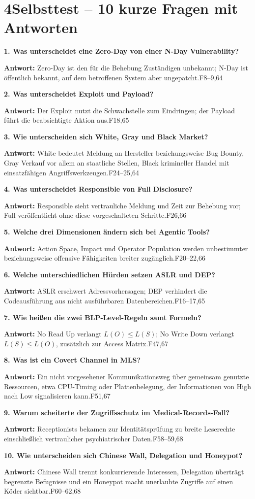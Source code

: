 \documentclass[11pt,a4paper]{article}
\newcommand{\qa}[3]{\par\vspace{8pt}\textbf{#1. #2}\par\nopagebreak #3\par}
\begin{document}
\newpage
\section*{4\quad Selbsttest -- 10 kurze Fragen mit Antworten}
\qa{1}{Was unterscheidet eine Zero-Day von einer N-Day Vulnerability?}{\textbf{Antwort:} Zero-Day ist den für die Behebung Zuständigen unbekannt; N-Day ist öffentlich bekannt, auf dem betroffenen System aber ungepatcht.\hfill{\scriptsize F8--9,64}}
\qa{2}{Was unterscheidet Exploit und Payload?}{\textbf{Antwort:} Der Exploit nutzt die Schwachstelle zum Eindringen; der Payload führt die beabsichtigte Aktion aus.\hfill{\scriptsize F18,65}}
\qa{3}{Wie unterscheiden sich White, Gray und Black Market?}{\textbf{Antwort:} White bedeutet Meldung an Hersteller beziehungsweise Bug Bounty, Gray Verkauf vor allem an staatliche Stellen, Black krimineller Handel mit einsatzfähigen Angriffswerkzeugen.\hfill{\scriptsize F24--25,64}}
\qa{4}{Was unterscheidet Responsible von Full Disclosure?}{\textbf{Antwort:} Responsible sieht vertrauliche Meldung und Zeit zur Behebung vor; Full veröffentlicht ohne diese vorgeschalteten Schritte.\hfill{\scriptsize F26,66}}
\qa{5}{Welche drei Dimensionen ändern sich bei Agentic Tools?}{\textbf{Antwort:} Action Space, Impact und Operator Population werden unbestimmter beziehungsweise offensive Fähigkeiten breiter zugänglich.\hfill{\scriptsize F20--22,66}}
\qa{6}{Welche unterschiedlichen Hürden setzen ASLR und DEP?}{\textbf{Antwort:} ASLR erschwert Adressvorhersagen; DEP verhindert die Codeausführung aus nicht ausführbaren Datenbereichen.\hfill{\scriptsize F16--17,65}}
\qa{7}{Wie heißen die zwei BLP-Level-Regeln samt Formeln?}{\textbf{Antwort:} No Read Up verlangt $L(O)\leq L(S)$; No Write Down verlangt $L(S)\leq L(O)$, zusätzlich zur Access Matrix.\hfill{\scriptsize F47,67}}
\qa{8}{Was ist ein Covert Channel in MLS?}{\textbf{Antwort:} Ein nicht vorgesehener Kommunikationsweg über gemeinsam genutzte Ressourcen, etwa CPU-Timing oder Plattenbelegung, der Informationen von High nach Low signalisieren kann.\hfill{\scriptsize F51,67}}
\qa{9}{Warum scheiterte der Zugriffsschutz im Medical-Records-Fall?}{\textbf{Antwort:} Receptionists bekamen zur Identitätsprüfung zu breite Leserechte einschließlich vertraulicher psychiatrischer Daten.\hfill{\scriptsize F58--59,68}}
\qa{10}{Wie unterscheiden sich Chinese Wall, Delegation und Honeypot?}{\textbf{Antwort:} Chinese Wall trennt konkurrierende Interessen, Delegation überträgt begrenzte Befugnisse und ein Honeypot macht unerlaubte Zugriffe auf einen Köder sichtbar.\hfill{\scriptsize F60--62,68}}
\end{document}
